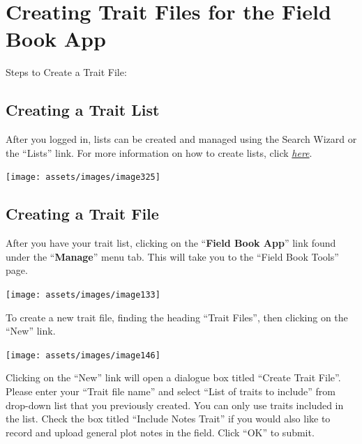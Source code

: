 \documentclass[
  12pt,
]{book}
\begin{document}
\hypertarget{creating-trait-files}{%
\section{Creating Trait Files for the Field Book App}\label{creating-trait-files}}

Steps to Create a Trait File:

\hypertarget{creating-a-trait-list}{%
\subsection{Creating a Trait List}\label{creating-a-trait-list}}

After you logged in, lists can be created and managed using the Search Wizard or the ``Lists'' link. For more information on how to create lists, click \protect\hyperlink{working-with-lists}{\emph{here}}.

\begin{center}\texttt{[image: assets/images/image325]} \end{center}

\hypertarget{creating-a-trait-file}{%
\subsection{Creating a Trait File}\label{creating-a-trait-file}}

After you have your trait list, clicking on the ``\textbf{Field Book App}'' link found under the ``\textbf{Manage}'' menu tab. This will take you to the ``Field Book Tools'' page.

\begin{center}\texttt{[image: assets/images/image133]} \end{center}

To create a new trait file, finding the heading ``Trait Files'', then clicking on the ``New'' link.

\begin{center}\texttt{[image: assets/images/image146]} \end{center}

Clicking on the ``New'' link will open a dialogue box titled ``Create Trait File''. Please enter your ``Trait file name'' and select ``List of traits to include'' from drop-down list that you previously created. You can only use traits included in the list. Check the box titled ``Include Notes Trait'' if you would also like to record and upload general plot notes in the field. Click ``OK'' to submit.
\end{document}
